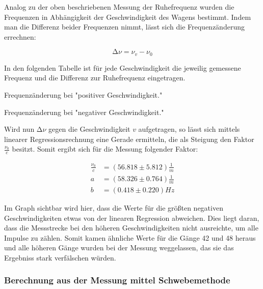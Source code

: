 Analog zu der oben beschriebenen Messung der Ruhefrequenz wurden die Frequenzen in Abhängigkeit
der Geschwindigkeit des Wagens bestimmt. Indem man die Differenz beider Frequenzen nimmt, lässt
sich die Frequenzänderung errechnen:

\begin{equation}
  \increment \nu = \nu_v - \nu_0
\end{equation}

In den folgenden Tabelle ist für jede Geschwindigkeit die jeweilig gemessene Frequenz und die
Differenz zur Ruhefrequenz eingetragen.

\begin{table}
  \centering
  \caption{Frequenzänderung bei "positiver Geschwindigkeit."}
\end{table}

\begin{table}
  \centering
  \caption{Frequenzänderung bei "negativer Geschwindigkeit."}
\end{table}

\newpage

Wird nun $\increment \nu$ gegen die Geschwindigkeit $v$ aufgetragen, so lässt sich mittels linearer
Regressionsrechnung eine Gerade ermitteln, die als Steigung den Faktor $\frac{\nu_0}{c}$ besitzt.
Somit ergibt sich für die Messung folgender Faktor:

\begin{align}
  \frac{\nu_0}{c} &= (56.818 \pm 5.812) \frac{1}{m} \\
  a               &= (58.326 \pm 0.764) \frac{1}{m} \\
  b               &= (0.418 \pm 0.220) Hz
\end{align}

Im Graph sichtbar wird hier, dass die Werte für die größten negativen Geschwindigkeiten etwas
von der linearen Regression abweichen. Dies liegt daran, dass die Messstrecke bei den höheren
Geschwindigkeiten nicht ausreichte, um alle Impulse zu zählen. Somit kamen ähnliche Werte für
die Gänge 42 und 48 heraus und alle höheren Gänge wurden bei der Messung weggelassen, das sie
das Ergebniss stark verfälschen würden.


\subsubsection{Berechnung aus der Messung mittel Schwebemethode}


